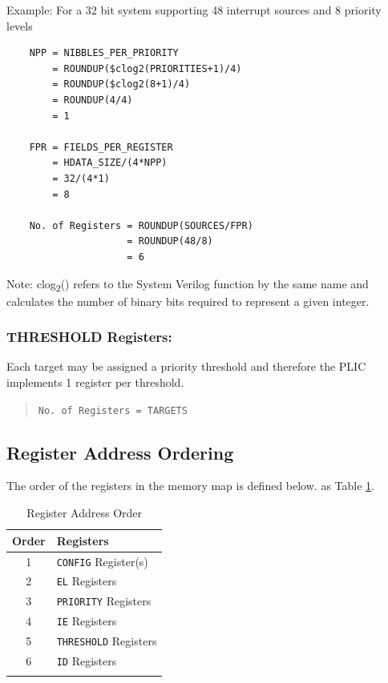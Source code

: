 Example: For a 32 bit system supporting 48 interrupt sources and 8 priority levels

\begin{verbatim}
    NPP = NIBBLES_PER_PRIORITY
        = ROUNDUP($clog2(PRIORITIES+1)/4)
        = ROUNDUP($clog2(8+1)/4)
        = ROUNDUP(4/4)
        = 1

    FPR = FIELDS_PER_REGISTER
        = HDATA_SIZE/(4*NPP)
        = 32/(4*1)
        = 8

    No. of Registers = ROUNDUP(SOURCES/FPR)
                     = ROUNDUP(48/8)
                     = 6
\end{verbatim}

Note: clog\textsubscript{2}() refers to the System Verilog function by the same name and calculates the number of binary bits required to represent a given integer.

\subsubsection{THRESHOLD Registers:}

Each target may be assigned a priority threshold and therefore the PLIC implements 1 register per threshold.

\begin{quote}
\texttt{No.\ of\ Registers\ =\ TARGETS}
\end{quote}

\subsection{Register Address Ordering}

The order of the registers in the memory map is defined 
\ifdefined\MARKDOWN
below.
\else
as Table \ref{tab:REGMAP}.
\fi

\begin{longtable}[]{@{}cl@{}}	
	\toprule 
	\textbf{Order} & \textbf{Registers}\\
	\midrule
	\endhead 
	1 & \texttt{CONFIG} Register(s)\\
	2 & \texttt{EL} Registers\\
	3 & \texttt{PRIORITY} Registers\\
	4 & \texttt{IE} Registers\\
	5 & \texttt{THRESHOLD} Registers\\
	6 & \texttt{ID} Registers\\
	\bottomrule 	
	\caption{Register Address Order}
	\label{tab:REGMAP}
\end{longtable}

